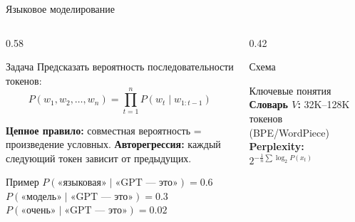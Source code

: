 \documentclass[aspectratio=169, 8pt]{beamer}
\begin{document}
\begin{frame}{Языковое моделирование}
  \begin{columns}[T]
    \begin{column}{0.58\textwidth}
      \begin{block}{Задача}
        Предсказать вероятность последовательности токенов:
        \[
        P(w_1, w_2, \dots, w_n) = \prod_{t=1}^n P(w_t \mid w_{1:t-1})
        \]
      \end{block}
      \textbf{Цепное правило:} совместная вероятность = произведение условных.
      \textbf{Авторегрессия:} каждый следующий токен зависит от предыдущих.
      \vspace{0.2em}
      \begin{block}{Пример}
        $P(\text{«языковая»} \mid \text{«GPT — это»}) = 0.6$ \\
        $P(\text{«модель»} \mid \text{«GPT — это»}) = 0.3$ \\
        $P(\text{«очень»} \mid \text{«GPT — это»}) = 0.02$
      \end{block}
    \end{column}
    \begin{column}{0.42\textwidth}
      \begin{block}{Схема}
        \centering
      \end{block}
      \begin{block}{Ключевые понятия}
        \textbf{Словарь $V$:} 32K--128K токенов (BPE/WordPiece) \\
        \textbf{Perplexity:} $2^{-\frac{1}{n}\sum \log_2 P(x_t)}$
      \end{block}
    \end{column}
  \end{columns}
\end{frame}
\end{document}
